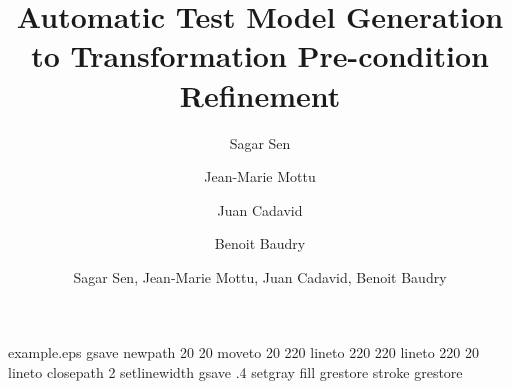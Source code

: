 %
%
%
%
\begin{filecontents*}{example.eps}
gsave
newpath
  20 20 moveto
  20 220 lineto
  220 220 lineto
  220 20 lineto
closepath
2 setlinewidth
gsave
  .4 setgray fill
grestore
stroke
grestore
\end{filecontents*}
%
\documentclass[global,twocolumn]{svjour}

\usepackage{graphicx}
\usepackage{epsfig}

\usepackage{graphics}
\usepackage{amssymb}
\usepackage{color}
\usepackage{listings}
\usepackage{pslatex}
\usepackage{subtable}
\usepackage{multirow}
\usepackage{url}
\usepackage[normalem]{ulem}
\usepackage{./styles/lstlang0}
\usepackage{./styles/lstAlloy}





\title{Automatic Test Model Generation to Transformation Pre-condition Refinement}


\author{Sagar Sen \and Jean-Marie Mottu \and Juan Cadavid \and Benoit Baudry 
}

%
%

\author{Sagar Sen, Jean-Marie Mottu, Juan Cadavid, Benoit Baudry}

	



